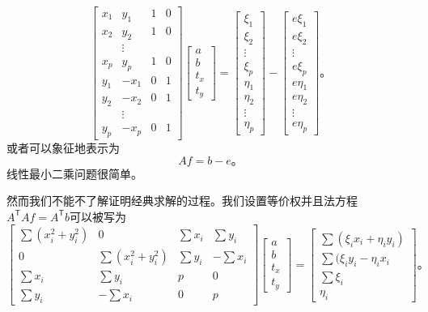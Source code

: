 \begin{equation}
	\begin{bmatrix}
		x_1 & y_1 & 1 & 0\\
		x_2 & y_2 & 1 & 0\\
		&\vdots\\
		x_p & y_p & 1 & 0\\
		y_1 &-x_1 & 0 & 1\\
		y_2 &-x_2 & 0 & 1\\
		&\vdots\\
		y_p &-x_p & 0 & 1
	\end{bmatrix}
	\begin{bmatrix}
		a\\
		b\\
		t_x\\
		t_y
	\end{bmatrix}
	=
	\begin{bmatrix}
		\xi_1\\
		\xi_2\\
		\vdots\\
		\xi_p\\
		\eta_1\\
		\eta_2\\
		\vdots\\
		\eta_p
	\end{bmatrix}
	-
	\begin{bmatrix}
		e\xi_1\\
		e\xi_2\\
		\vdots\\
		e\xi_p\\
		e \eta_1\\
		e\eta_2\\
		\vdots\\
		e\eta_p
	\end{bmatrix}\text{。}
\end{equation}
或者可以象征地表示为
\begin{equation*}
	Af = b - e \text{。}
\end{equation*}
线性最小二乘问题很简单。
\par
然而我们不能不了解证明经典求解的过程。我们设置等价权并且法方程$A^\mathsf{T}Af = A^\mathsf{T}b$可以被写为
\begin{equation}
	\begin{bmatrix}
		\sum(x_{i}^{2} + y_{i}^{2}) & 0 & \sum x_i & \sum y_i\\
		0 & \sum(x_{i}^{2} + y_{i}^{2}) & \sum y_i & -\sum x_i\\
		\sum x_i & \sum y_i & p & 0\\
		\sum y_i &-\sum x_i & 0 & p
	\end{bmatrix}
	\begin{bmatrix}
		a\\
		b\\
		t_x\\
		t_y
	\end{bmatrix}
	=
	\begin{bmatrix}
		\sum(\xi_ix_i + \eta_iy_i)\\
		\sum(\xi_iy_i - \eta_ix_i\\
		\sum\xi_i\\
		\eta_i
	\end{bmatrix}\text{。}
\end{equation}

